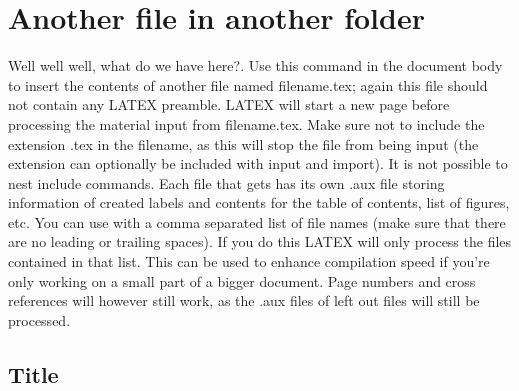 \chapter{Another file in another folder}
Well well well, what do we have here?. Use this command in the document body to insert the contents of another file named filename.tex; again this file should not contain any LATEX preamble. LATEX will start a new page before processing the material input from filename.tex. Make sure not to include the extension .tex in the filename, as this will stop the file from being input (the extension can optionally be included with input and import). It is not possible to nest include commands. Each file that gets has its own .aux file storing information of created labels and contents for the table of contents, list of figures, etc. You can use  with a comma separated list of file names (make sure that there are no leading or trailing spaces). If you do this LATEX will only process the files contained in that list. This can be used to enhance compilation speed if you're only working on a small part of a bigger document. Page numbers and cross references will however still work, as the .aux files of left out files will still be processed.
\section{Title}
\lipsum[1-2]